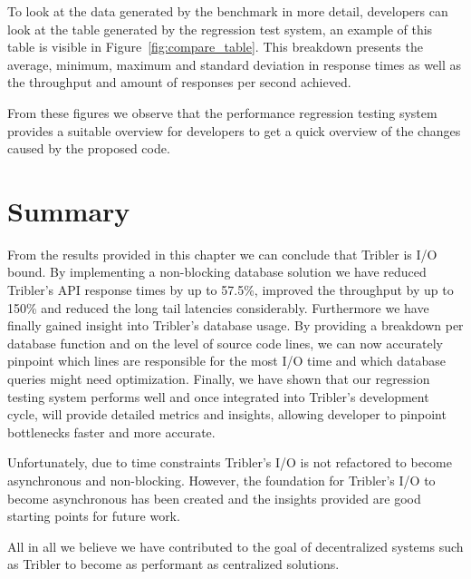 To look at the data generated by the benchmark in more detail, developers can look at the table generated by the regression test system, an example of this table is visible in Figure~\ref{fig:compare_table}.
This breakdown presents the average, minimum, maximum and standard deviation in response times as well as the throughput and amount of responses per second achieved.

From these figures we observe that the performance regression testing system provides a suitable overview for developers to get a quick overview of the changes caused by the proposed code.

\section{Summary}

From the results provided in this chapter we can conclude that Tribler is I/O bound.
By implementing a non-blocking database solution we have reduced Tribler's API response times by up to 57.5\%, improved the throughput by up to 150\% and reduced the long tail latencies considerably.
Furthermore we have finally gained insight into Tribler's database usage.
By providing a breakdown per database function and on the level of source code lines, we can now accurately pinpoint which lines are responsible for the most I/O time and which database queries might need optimization.
Finally, we have shown that our regression testing system performs well and once integrated into Tribler's development cycle, will provide detailed metrics and insights, allowing developer to pinpoint bottlenecks faster and more accurate.

Unfortunately, due to time constraints Tribler's I/O is not refactored to become asynchronous and non-blocking.
However, the foundation for Tribler's I/O to become asynchronous has been created and the insights provided are good starting points for future work.

All in all we believe we have contributed to the goal of decentralized systems such as Tribler to become as performant as centralized solutions. 
